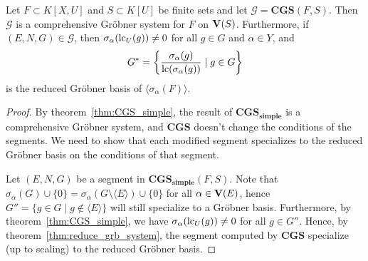 \begin{theorem}\label{thm:CGS}
  Let $F \subset K[X, U]$ and $S \subset K[U]$ be finite sets and let $\mathcal G = \mathbf{CGS}(F, S)$. Then $\mathcal G$ is a comprehensive Gröbner system for $F$ on $\operatorname{\mathbf V}(S)$. Furthermore, if $(E, N, G) \in \mathcal G$, then $\sigma_{\alpha}(\operatorname{lc}_{U}(g)) \neq 0$ for all $g \in G$ and $\alpha \in Y$, and
  \[G^{*} = \left\{\frac{\sigma_{\alpha}(g)}{\operatorname{lc}(\sigma_{\alpha}(g))} \mid g \in G \right\}\]
  is the reduced Gröbner basis of $\langle \sigma_{\alpha}(F) \rangle$.
\end{theorem}
\begin{proof}
  By theorem~\ref{thm:CGS_simple}, the result of $\mathbf{CGS_{simple}}$ is a comprehensive Gröbner system, and $\mathbf{CGS}$ doesn't change the conditions of the segments. We need to show that each modified segment specializes to the reduced Gröbner basis on the conditions of that segment.

  Let $(E, N, G)$ be a segment in $\mathbf{CGS_{simple}}(F, S)$. Note that $\sigma_{\alpha}(G) \cup \{0\} = \sigma_{\alpha}(G \setminus \langle E \rangle) \cup \{0\}$ for all $\alpha \in \operatorname{\mathbf V}(E)$, hence $G'' = \{g \in G \mid g \notin \langle E \rangle\}$ will still specialize to a Gröbner basis. Furthermore, by theorem~\ref{thm:CGS_simple}, we have $\sigma_{\alpha}(\operatorname{lc}_{U}(g)) \neq 0$ for all $g \in G''$. Hence, by theorem~\ref{thm:reduce_grb_system}, the segment computed by $\mathbf{CGS}$ specialize (up to scaling) to the reduced Gröbner basis.
\end{proof}




